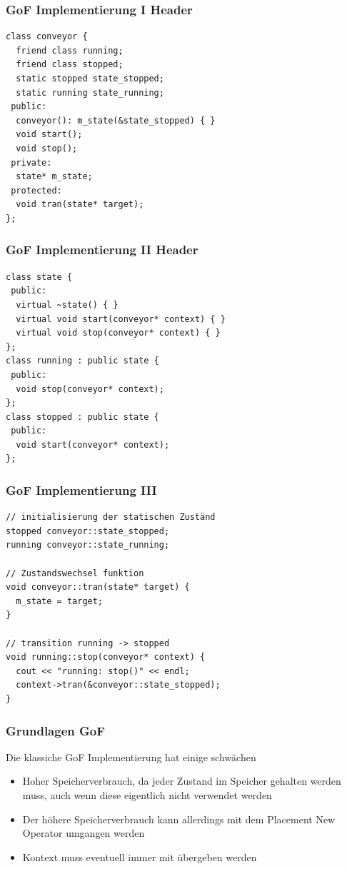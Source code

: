 \documentclass{beamer}
\begin{document}
\begin{frame}[fragile]
 \frametitle{GoF Implementierung I Header}
 \begin{lstlisting}
class conveyor {
  friend class running;
  friend class stopped;
  static stopped state_stopped;
  static running state_running;
 public:
  conveyor(): m_state(&state_stopped) { }
  void start();
  void stop();
 private:
  state* m_state;
 protected:
  void tran(state* target);
};
 \end{lstlisting}
\end{frame}

\begin{frame}[fragile]
 \frametitle{GoF Implementierung II Header}
 \begin{lstlisting}
class state {
 public:
  virtual ~state() { }
  virtual void start(conveyor* context) { }
  virtual void stop(conveyor* context) { }
};
class running : public state {
 public:
  void stop(conveyor* context);
};
class stopped : public state {
 public:
  void start(conveyor* context);
};
 \end{lstlisting}
\end{frame}

\begin{frame}[fragile]
 \frametitle{GoF Implementierung III}
 \begin{lstlisting}
// initialisierung der statischen Zuständ
stopped conveyor::state_stopped;
running conveyor::state_running;

// Zustandswechsel funktion
void conveyor::tran(state* target) {
  m_state = target;
}

// transition running -> stopped
void running::stop(conveyor* context) {
  cout << "running: stop()" << endl;
  context->tran(&conveyor::state_stopped);
}
 \end{lstlisting}
\end{frame}


\begin{frame}
 \frametitle{Grundlagen GoF}
 Die klassiche GoF Implementierung hat einige schw\"achen
 \begin{itemize}
  \item Hoher Speicherverbrauch, da jeder Zustand im Speicher gehalten werden muss, auch wenn diese eigentlich nicht verwendet werden
  \item Der h\"ohere Speicherverbrauch kann allerdings mit dem Placement New Operator umgangen werden
  \item Kontext muss eventuell immer mit \"ubergeben werden
 \end{itemize}
\end{frame}
\end{document}
